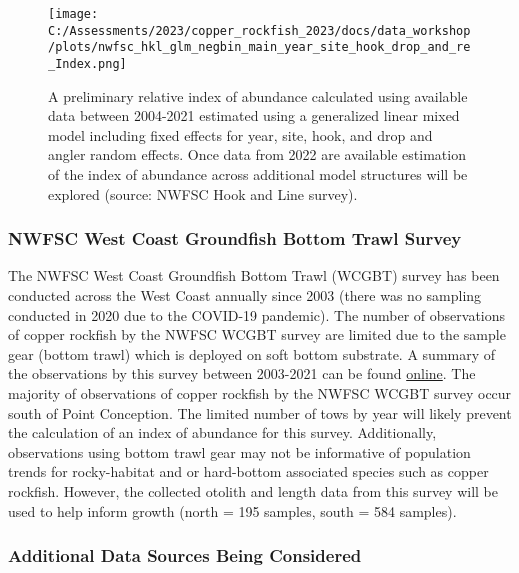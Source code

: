 \documentclass[
]{article}
\begin{document}
\begin{figure}
\centering
\texttt{[image: C:/Assessments/2023/copper\_rockfish\_2023/docs/data\_workshop/plots/nwfsc\_hkl\_glm\_negbin\_main\_year\_site\_hook\_drop\_and\_re\_Index.png]}
\caption{A preliminary relative index of abundance calculated using
available data between 2004-2021 estimated using a generalized linear
mixed model including fixed effects for year, site, hook, and drop and
angler random effects. Once data from 2022 are available estimation of
the index of abundance across additional model structures will be
explored (source: NWFSC Hook and Line survey).\label{fig:hkl-index}}
\end{figure}

\hypertarget{nwfsc-west-coast-groundfish-bottom-trawl-survey}{%
\subsubsection{NWFSC West Coast Groundfish Bottom Trawl
Survey}\label{nwfsc-west-coast-groundfish-bottom-trawl-survey}}

The NWFSC West Coast Groundfish Bottom Trawl (WCGBT) survey has been
conducted across the West Coast annually since 2003 (there was no
sampling conducted in 2020 due to the COVID-19 pandemic). The number of
observations of copper rockfish by the NWFSC WCGBT survey are limited
due to the sample gear (bottom trawl) which is deployed on soft bottom
substrate. A summary of the observations by this survey between
2003-2021 can be found
\href{https://www.pcouncil.org/documents/2022/05/f-3-attachment-4-detailed-summary-of-available-data-to-support-west-coast-groundfish-stock-assessments-in-2023-electronic-only.pdf\#page=111}{online}.
The majority of observations of copper rockfish by the NWFSC WCGBT
survey occur south of Point Conception. The limited number of tows by
year will likely prevent the calculation of an index of abundance for
this survey. Additionally, observations using bottom trawl gear may not
be informative of population trends for rocky-habitat and or hard-bottom
associated species such as copper rockfish. However, the collected
otolith and length data from this survey will be used to help inform
growth (north = 195 samples, south = 584 samples).

\hypertarget{additional-data-sources-being-considered}{%
\subsubsection{Additional Data Sources Being
Considered}\label{additional-data-sources-being-considered}}
\end{document}
